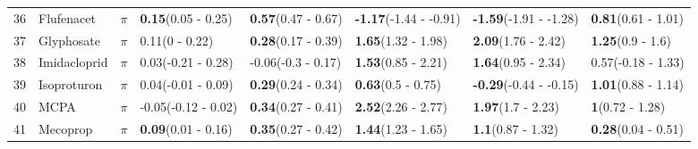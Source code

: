 \begin{longtable}{lp{2cm}p{0.7cm}p{2cm}p{2cm}p{2cm}p{2cm}p{2cm}}
  36 & Flufenacet & $\pi$ & \textbf{0.15}\newline (0.05 - 0.25) & \textbf{0.57}\newline (0.47 - 0.67) & \textbf{-1.17}\newline (-1.44 - -0.91) & \textbf{-1.59}\newline (-1.91 - -1.28) & \textbf{0.81}\newline (0.61 - 1.01) \\ 
  37 & Glyphosate & $\pi$ & 0.11\newline (0 - 0.22) & \textbf{0.28}\newline (0.17 - 0.39) & \textbf{1.65}\newline (1.32 - 1.98) & \textbf{2.09}\newline (1.76 - 2.42) & \textbf{1.25}\newline (0.9 - 1.6) \\ 
  38 & Imidacloprid & $\pi$ & 0.03\newline (-0.21 - 0.28) & -0.06\newline (-0.3 - 0.17) & \textbf{1.53}\newline (0.85 - 2.21) & \textbf{1.64}\newline (0.95 - 2.34) & 0.57\newline (-0.18 - 1.33) \\ 
  39 & Isoproturon & $\pi$ & 0.04\newline (-0.01 - 0.09) & \textbf{0.29}\newline (0.24 - 0.34) & \textbf{0.63}\newline (0.5 - 0.75) & \textbf{-0.29}\newline (-0.44 - -0.15) & \textbf{1.01}\newline (0.88 - 1.14) \\ 
  40 & MCPA & $\pi$ & -0.05\newline (-0.12 - 0.02) & \textbf{0.34}\newline (0.27 - 0.41) & \textbf{2.52}\newline (2.26 - 2.77) & \textbf{1.97}\newline (1.7 - 2.23) & \textbf{1}\newline (0.72 - 1.28) \\ 
  41 & Mecoprop & $\pi$ & \textbf{0.09}\newline (0.01 - 0.16) & \textbf{0.35}\newline (0.27 - 0.42) & \textbf{1.44}\newline (1.23 - 1.65) & \textbf{1.1}\newline (0.87 - 1.32) & \textbf{0.28}\newline (0.04 - 0.51) \\ 

\end{longtable}
